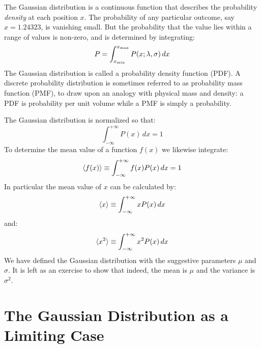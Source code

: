 \documentclass[12pt,oneside]{book}
\begin{document}
The Gaussian distribution is a continuous function that describes the
probability {\em density} at each position $x$.  The probability of
any particular outcome, say $x=1.24323$, is vanishing small.  But the
probability that the value lies within a range of values is non-zero,
and is determined by integrating:
\begin{displaymath}
P = \int_{x_{\rm min}}^{x_{\rm max}} P(x;\lambda,\sigma) \, dx
\end{displaymath}
The Gaussian distribution is called a probability density function
(PDF).  A discrete probability distribution is sometimes referred to
as probability mass function (PMF), to draw upon an analogy with
physical mass and density: a PDF is probability per unit volume while
a PMF is simply a probability.

The Gaussian distribution is normalized so that:
\begin{displaymath}
\int_{-\infty}^{+\infty} P(x) \, dx = 1
\end{displaymath}
To determine the mean value of a function $f(x)$ we likewise integrate:
\begin{displaymath}
\braket{f(x)} \equiv \int_{-\infty}^{+\infty} f(x) P(x) \, dx = 1
\end{displaymath}
In particular the mean value of $x$ can be calculated by:
\begin{displaymath}
\braket{x} \equiv \int_{-\infty}^{+\infty} x P(x) \, dx 
\end{displaymath}
and:
\begin{displaymath}
\braket{x^2}  \equiv \int_{-\infty}^{+\infty} x^2 P(x) \, dx 
\end{displaymath}
We have defined the Gaussian distribution with the suggestive
parameters $\mu$ and $\sigma$.  It is left as an exercise to show
that indeed, the mean is $\mu$ and the variance is $\sigma^2$.


\section{The Gaussian Distribution as a Limiting Case}
\label{sec:gaussfrompoisson}
\end{document}
